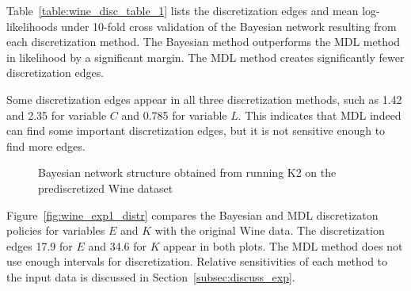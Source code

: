 Table~\ref{table:wine_disc_table_1} lists the discretization edges and mean log-likelihoods under \num{10}-fold cross validation of the Bayesian network resulting from each discretization method.
The Bayesian method outperforms the MDL method in likelihood by a significant margin.
The MDL method creates significantly fewer discretization edges.

Some discretization edges appear in all three discretization methods, such as \num{1.42} and \num{2.35} for variable $C$ and \num{0.785} for variable $L$.
This indicates that MDL indeed can find some important discretization edges, but it is not sensitive enough to find more edges.

\begin{figure}[ht]
  \centering
  \scalebox{0.8}{}
  \caption{Bayesian network structure obtained from running K2 on the prediscretized Wine dataset}
  \label{fig:wine_graph_1}
\end{figure}

\begin{table}
  \centering
  \caption{
    Results from discretization of the Wine MPG dataset with fixed structure.
    Bold discretization edges were identified by both methods.
  }
  \scalebox{1.0}{
  
  }
  \label{table:wine_disc_table_1}
\end{table}

Figure~\ref{fig:wine_exp1_distr} compares the Bayesian and MDL discretizaton policies for variables $E$ and $K$ with the original Wine data.
The discretization edges \num{17.9} for $E$ and \num{34.6} for $K$ appear in both plots.
The MDL method does not use enough intervals for discretization.
Relative sensitivities of each method to the input data is discussed in Section~\ref{subsec:discuss_exp}.

